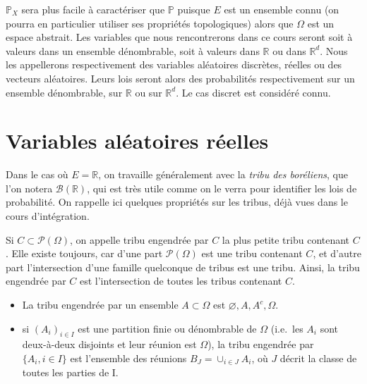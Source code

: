 \(\mathbb{P}_X\) sera plus facile à caractériser que \(\mathbb{P}\)
puisque \(E\) est un ensemble connu (on pourra en particulier utiliser
ses propriétés topologiques) alors que \(\Omega\) est un espace
abstrait. Les variables que nous rencontrerons dans ce cours seront soit
à valeurs dans un ensemble dénombrable, soit à valeurs dans
\(\mathbb{R}\) ou dans \(\mathbb{R}^d\). Nous les appellerons
respectivement des variables aléatoires discrètes, réelles ou des
vecteurs aléatoires. Leurs lois seront alors des probabilités
respectivement sur un ensemble dénombrable, sur \(\mathbb{R}\) ou sur
\(\mathbb{R}^d\). Le cas discret est considéré connu.

\section{Variables aléatoires
réelles}\label{I-variables-aluxe9atoires-ruxe9elles}

Dans le cas où \(E = \mathbb{R}\), on travaille généralement avec la
\emph{tribu des boréliens}, que l'on notera \(\mathcal{B}(\mathbb{R})\),
qui est très utile comme on le verra pour identifier les lois de
probabilité. On rappelle ici quelques propriétés sur les tribus, déjà
vues dans le cours d'intégration.

\begin{definition}\label{I-tribu-engendruxe9e}

Si \(C \subset \mathcal{P}(\Omega)\), on appelle tribu engendrée par
\(C\) la plus petite tribu contenant \(C\). Elle existe toujours, car
d'une part \(\mathcal{P}(\Omega)\) est une tribu contenant \(C\), et
d'autre part l'intersection d'une famille quelconque de tribus est une
tribu. Ainsi, la tribu engendrée par \(C\) est l'intersection de toutes
les tribus contenant \(C\).
\end{definition}

\begin{exemple}\label{I-tribus-engendruxe9es}

\begin{itemize}
\tightlist
\item
  La tribu engendrée par un ensemble \(A \subset \Omega\) est
  \({\varnothing, A, A^c , \Omega}\).
\item
  si \((A_i )_{i \in I}\) est une partition finie ou dénombrable de
  \(\Omega\) (i.e.~les \(A_i\) sont deux-à-deux disjoints et leur
  réunion est \(\Omega\)), la tribu engendrée par \(\{A_i , i \in I\}\)
  est l'ensemble des réunions \(B_J = \cup_{i \in J} A_i\), où \(J\)
  décrit la classe de toutes les parties de I.
\end{itemize}
\end{exemple}

